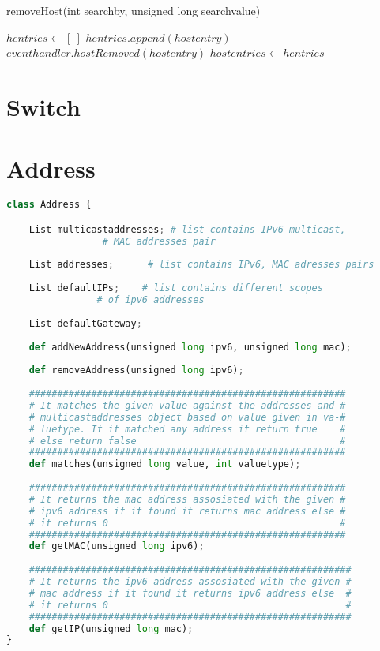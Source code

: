 \documentclass[10pt,a4paper,titlepage]{report}
\begin{document}
			\begin{algorithm}
				\caption {removeHost(int searchby, unsigned long searchvalue)}
				\begin{algorithmic}[1]
					\STATE $hentries \leftarrow [\ ]$
							\STATE $hentries.append(hostentry)$
							\CONTINUE
						\ENDIF
						\STATE $eventhandler.hostRemoved(hostentry)$
					\ENDFOR
					\STATE $hostentries \leftarrow hentries$
				\end{algorithmic}
			\end{algorithm}
			
	\section{Switch}
	\section{Address}
		\begin{lstlisting}[language=Python]
class Address {

	List multicastaddresses; # list contains IPv6 multicast, 
				 # MAC addresses pair
		
	List addresses;		 # list contains IPv6, MAC adresses pairs
		
	List defaultIPs;	# list contains different scopes 
				# of ipv6 addresses
	
	List defaultGateway;
		
	def addNewAddress(unsigned long ipv6, unsigned long mac);
		
	def removeAddress(unsigned long ipv6);
		
	########################################################
	# It matches the given value against the addresses and #
	# multicastaddresses object based on value given in va-#
	# luetype. If it matched any address it return true    #
	# else return false                                    #
	########################################################
	def matches(unsigned long value, int valuetype);
	
	########################################################
	# It returns the mac address assosiated with the given #
	# ipv6 address if it found it returns mac address else #
	# it returns 0                                         #
	########################################################
	def getMAC(unsigned long ipv6);
	
	#########################################################
	# It returns the ipv6 address assosiated with the given #
	# mac address if it found it returns ipv6 address else  #
	# it returns 0                                          #
	#########################################################
	def getIP(unsigned long mac);
}
		\end{lstlisting}
		\newpage
		
\end{document}
